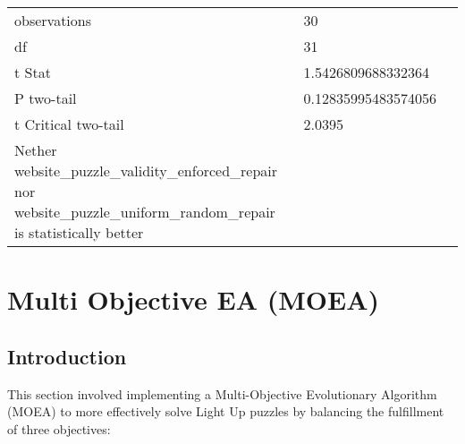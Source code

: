 \documentclass[11pt]{article}
\begin{document}
\begin{table}[H]
{\begin{tabular}{|l|l|l|}
                                                                                                                        &                                         &                                            \\ \hline
    observations                                                                                                          & 30                                      &                                            \\ \hline
    df                                                                                                                    & 31                                      &                                            \\ \hline
    t Stat                                                                                                                & 1.5426809688332364                      &                                            \\ \hline
    P two-tail                                                                                                            & 0.12835995483574056                     &                                            \\ \hline
    t Critical two-tail                                                                                                   & 2.0395                                  &                                            \\ \hline
    Nether website\_puzzle\_validity\_enforced\_repair nor website\_puzzle\_uniform\_random\_repair is statistically better &                                         &                                            \\ \hline
    \end{tabular}%
    }
\end{table}


\section{Multi Objective EA (MOEA)}

\subsection{Introduction}

This section involved implementing a Multi-Objective Evolutionary Algorithm (MOEA)
to more effectively solve Light Up puzzles by balancing the fulfillment of three
objectives: 
\end{document}
